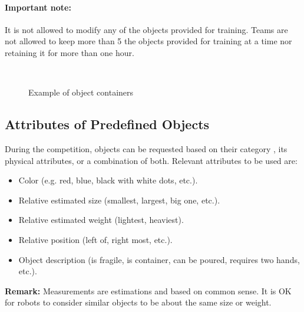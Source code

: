 \paragraph*{Important note:} It is not allowed to modify any of the objects provided for training.
Teams are not allowed to keep more than 5 the objects provided for training at a time nor retaining it for more than one hour.

\begin{figure}[H]
	\centering
	~
	~
	\caption{Example of object containers}
	\label{fig:scenario_containers}
\end{figure}

\subsection{Attributes of Predefined Objects}
\label{rule:scenario_objects_attributes}
During the competition, objects can be requested based on their category , its physical attributes, or a combination of both.
Relevant attributes to be used are:
\begin{itemize}
	\item Color (e.g. red, blue, black with white dots, etc.).
	\item Relative estimated size (smallest, largest, big one, etc.).
	\item Relative estimated weight (lightest, heaviest).
	\item Relative position (left of, right most, etc.).
	\item Object description (is fragile, is container, can be poured, requires two hands, etc.).
\end{itemize}

\noindent\textbf{Remark:} Measurements are estimations and based on common sense. It is OK for robots to consider similar objects to be about the same size or weight.

%
%

